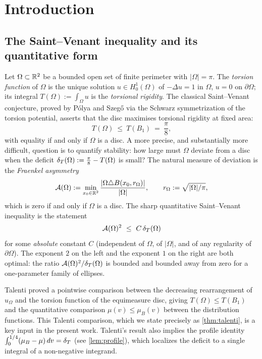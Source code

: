 \section{Introduction}
\label{sec:intro}

\subsection*{The Saint--Venant inequality and its quantitative form}

Let $\Omega\subset\mathbb{R}^2$ be a bounded open set of finite perimeter with
$|\Omega|=\pi$.  The \emph{torsion function} of $\Omega$ is the unique
solution $u\in H^1_0(\Omega)$ of $-\Delta u=1$ in $\Omega$, $u=0$ on
$\partial\Omega$; its integral $T(\Omega):=\int_\Omega u$ is the
\emph{torsional rigidity}.  The classical Saint--Venant conjecture,
proved by P\'olya and Szeg\H{o} \cite{PolyaSzego1951} via the
Schwarz symmetrization of the torsion potential, asserts that the disc
maximises torsional rigidity at fixed area:
\[
  T(\Omega)\ \le\ T(B_1)\ =\ \frac{\pi}{8},
\]
with equality if and only if $\Omega$ is a disc.  A more precise, and
substantially more difficult, question is to quantify stability: how
large must $\Omega$ deviate from a disc when the deficit
$\delta_T(\Omega):=\tfrac\pi8-T(\Omega)$ is small?  The natural measure of
deviation is the \emph{Fraenkel asymmetry}
\[
  \mathcal{A}(\Omega):=\min_{x_0\in\mathbb{R}^2}
    \frac{|\Omega\triangle B(x_0,r_\Omega)|}{|\Omega|},\qquad
  r_\Omega:=\sqrt{|\Omega|/\pi},
\]
which is zero if and only if $\Omega$ is a disc.  The sharp quantitative
Saint--Venant inequality is the statement
\begin{equation}\label{eq:sharp-main}
  \mathcal{A}(\Omega)^2\ \le\ C\,\delta_T(\Omega)
\end{equation}
for some \emph{absolute} constant $C$ (independent of $\Omega$, of $|\Omega|$,
and of any regularity of $\partial\Omega$).  The exponent $2$ on the
left and the exponent $1$ on the right are both optimal: the
ratio $\mathcal{A}(\Omega)^2/\delta_T(\Omega)$ is bounded and bounded away from
zero for a one-parameter family of ellipses.

Talenti \cite{Talenti1976} proved a pointwise comparison between the
decreasing rearrangement of $u_\Omega$ and the torsion function of the
equimeasure disc, giving $T(\Omega)\le T(B_1)$ and the quantitative
comparison $\mu(v)\le\mu_B(v)$ between the distribution functions.
This Talenti comparison, which we state precisely as \cref{thm:talenti},
is a key input in the present work.  Talenti's result also implies the
profile identity $\int_0^{1/4}(\mu_B-\mu)\,d v=\delta_T$ (see \cref{lem:profile}),
which localizes the deficit to a single integral of a non-negative
integrand.

